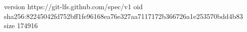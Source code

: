version https://git-lfs.github.com/spec/v1
oid sha256:82245042fd752bff1fe96168ea76e327aa7117172b366726a1e253570bdd4b83
size 174916
